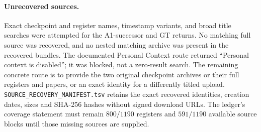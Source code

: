\paragraph{Unrecovered sources.}
Exact checkpoint and register names, timestamp variants, and broad
title searches were attempted for the A1-successor and GT returns.
No matching full source was recovered, and no nested matching archive
was present in the recovered bundles. The documented Personal Context
route returned ``Personal context is disabled''; it was blocked,
not a zero-result search. The remaining concrete route is to provide
the two original checkpoint archives or their full registers and papers,
or an exact identity for a differently titled upload.
\texttt{SOURCE\_RECOVERY\_MANIFEST.tsv} retains the exact recovered
identities, creation dates, sizes and SHA-256 hashes without signed
download URLs. The ledger's coverage statement must remain
$800/1190$ registers and $591/1190$ available source blocks until those
missing sources are supplied.
